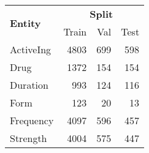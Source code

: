 
\begin{tabular}{l rrr}
    \toprule
    \multirow{2}{*}[-0.5\dimexpr \aboverulesep + \belowrulesep + \cmidrulewidth]{\bfseries Entity} &
    \multicolumn{3}{c}{\bfseries Split} \\
    \cmidrule(lr){2-4}
    & Train & Val & Test \\
    \midrule
    ActiveIng & 4803 & 699 & 598 \\
    Drug & 1372 & 154 & 154 \\
    Duration & 993 & 124 & 116 \\
    Form & 123 & 20 & 13 \\
    Frequency & 4097 & 596 & 457 \\
    Strength & 4004 & 575 & 447 \\
    \bottomrule
\end{tabular}
